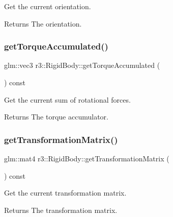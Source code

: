 Get the current orientation. 

\begin{DoxyReturn}{Returns}
The orientation. 
\end{DoxyReturn}
\mbox{\label{classr3_1_1_rigid_body_a8a5111fa2e4bd5f3a2615525da4c2949}} 
\subsubsection{\texorpdfstring{get\+Torque\+Accumulated()}{getTorqueAccumulated()}}
{\footnotesize\ttfamily glm\+::vec3 r3\+::\+Rigid\+Body\+::get\+Torque\+Accumulated (\begin{DoxyParamCaption}{ }\end{DoxyParamCaption}) const}



Get the current sum of rotational forces. 

\begin{DoxyReturn}{Returns}
The torque accumulator. 
\end{DoxyReturn}
\mbox{\label{classr3_1_1_rigid_body_a64a7edc9c2771caeceb54033d8953e2c}} 
\subsubsection{\texorpdfstring{get\+Transformation\+Matrix()}{getTransformationMatrix()}}
{\footnotesize\ttfamily glm\+::mat4 r3\+::\+Rigid\+Body\+::get\+Transformation\+Matrix (\begin{DoxyParamCaption}{ }\end{DoxyParamCaption}) const}



Get the current transformation matrix. 

\begin{DoxyReturn}{Returns}
The transformation matrix. 
\end{DoxyReturn}
\mbox{\label{classr3_1_1_rigid_body_a17b3c0a13865cdca6e43037ec7107d58}} 
